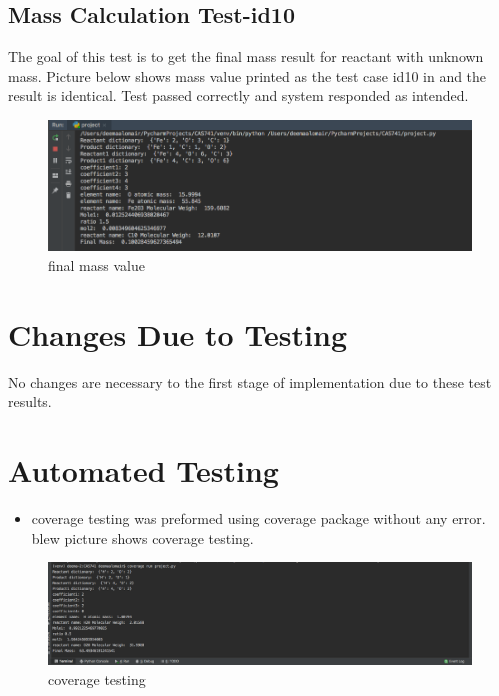 \documentclass[12pt, titlepage]{article}
\begin{document}
\subsection{Mass Calculation Test-id10}

The goal of this test is to get the final mass result for reactant with unknown mass. Picture below shows mass value printed as the test case id10 in \cite{SystemVnVPlan} and the result is identical. Test passed correctly and system responded as intended.

\begin{figure}[H]
 \begin{center}
 \includegraphics [width=\textwidth]{mass2}
 \caption{\label{ Figure 12:} final mass value}
 \end{center}
 \end{figure}

\section{Changes Due to Testing}

No changes are necessary to the first stage of implementation due to these test results.

\section{Automated Testing}

\begin{itemize}
\item coverage testing was preformed using coverage package without any error. blew picture shows coverage testing.
\end{itemize}

\begin{figure}[H]
 \begin{center}
 \includegraphics [width=\textwidth]{coverage}
 \caption{\label{ Figure 13:} coverage testing}
 \end{center}
 \end{figure}
\end{document}
